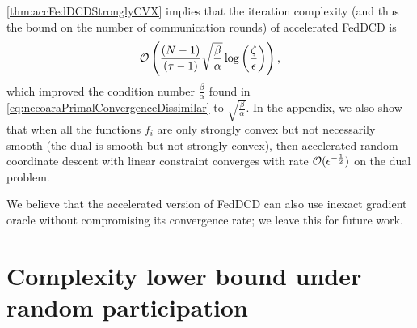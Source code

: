 \autoref{thm:accFedDCDStronglyCVX} implies that the iteration complexity (and thus the bound on the number of communication rounds) of accelerated FedDCD is 
\begin{equation}
        \mathcal{O}\left( \frac{(N-1) }{(\tau-1) } \sqrt{ \frac{\beta}{\alpha} } \log\left( \frac{ \zeta}{ \epsilon } \right) \right) , \label{eq:accFedDCDcomplexity}
\end{equation}
which improved the condition number $\frac{\beta}{\alpha}$ found in \eqref{eq:necoaraPrimalConvergenceDissimilar} to $\sqrt{\frac{\beta}{\alpha}}$. In the appendix, we also show that when all the functions $f_i$ are only strongly convex but not necessarily smooth (the dual is smooth but not strongly convex), then accelerated random coordinate descent with linear constraint converges with rate $\mathcal{O}( \epsilon^{-\frac{1}{2}} )$ on the dual problem.

We believe that the accelerated version of FedDCD can also use inexact gradient oracle without compromising its convergence rate; we leave this for future work.

\section{Complexity lower bound under random participation}
\label{sec:lowerBound}

